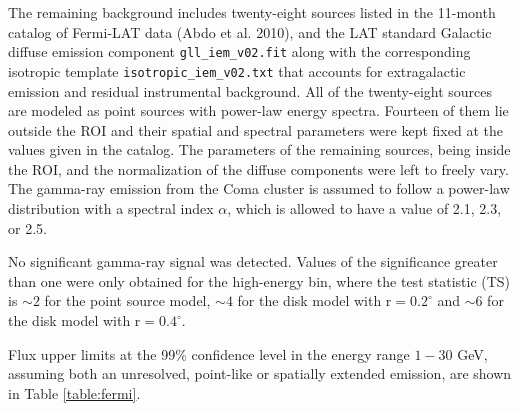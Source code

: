 \documentclass[12pt,manuscript]{aastex}
\begin{document}
The remaining background includes twenty-eight sources listed in the 11-month catalog of Fermi-LAT
data (Abdo et al. 2010), and the LAT standard Galactic diffuse emission component
\verb+gll_iem_v02.fit+ along with the corresponding isotropic template
\verb+isotropic_iem_v02.txt+ that accounts for extragalactic emission and residual instrumental
background. All of the twenty-eight sources are modeled as point sources with power-law energy
spectra. Fourteen of them lie outside the ROI and their spatial and spectral parameters were
kept fixed at the values given in the catalog. The parameters of the remaining sources, being
inside the ROI, and the normalization of the diffuse components were left to freely vary. The
gamma-ray emission from the Coma cluster is assumed to follow a power-law distribution with a
spectral index $\alpha$, which is allowed to have a value of 2.1, 2.3, or 2.5.

No significant gamma-ray signal was detected. Values of the significance greater than one were only
obtained for the high-energy bin, where the test statistic (TS) is $\sim2$ for the point source
model, $\sim4$ for the disk model with r$=0.2^{\circ}$ and $\sim6$ for the disk model with
r$=0.4^{\circ}$.

Flux upper limits at the 99\% confidence level in the energy range $1-30$ GeV, assuming both an
unresolved, point-like or spatially extended emission, are shown in Table \ref{table:fermi}.


%
%
\end{document}
